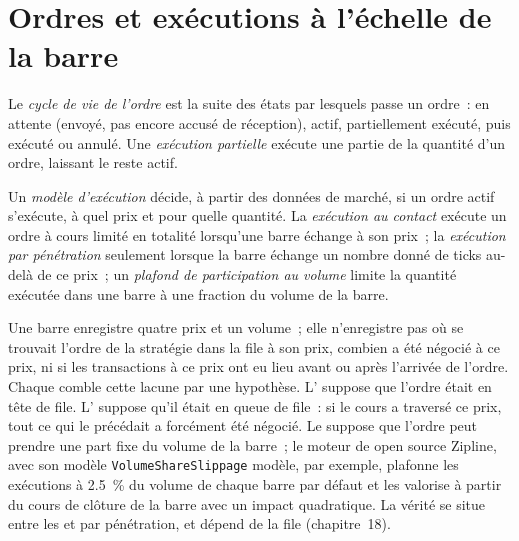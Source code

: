 \section{Ordres et exécutions à l'échelle de la barre}

\begin{definition}\label{def:rs:event-driven-backtests:lifecycle}
Le \emph{cycle de vie de l'ordre} est la suite des états par lesquels passe un ordre~: en attente (envoyé, pas encore accusé de réception),
actif, partiellement exécuté, puis exécuté ou annulé. Une \emph{exécution partielle} exécute une partie de la quantité d'un ordre, laissant le
reste actif.
\end{definition}

\begin{definition}\label{def:rs:event-driven-backtests:fill}
Un \emph{modèle d'exécution} décide, à partir des données de marché, si un ordre actif s'exécute, à quel prix et pour quelle quantité. La
\emph{exécution au contact} exécute un ordre à cours limité en totalité lorsqu'une barre échange à son prix~; la \emph{exécution par pénétration}
seulement lorsque la barre échange un nombre donné de ticks au-delà de ce prix~; un \emph{plafond de participation au volume} limite la quantité
exécutée dans une barre à une fraction du volume de la barre.
\end{definition}

Une barre enregistre quatre prix et un volume~; elle n'enregistre pas où se trouvait l'ordre de la stratégie dans la file à son prix, combien a été négocié à ce prix, ni
si les transactions à ce prix ont eu lieu avant ou après l'arrivée de l'ordre. Chaque  comble cette lacune par une hypothèse. L' suppose
que l'ordre était en tête de file. L' suppose qu'il était en queue de file~: si le cours a traversé ce prix, tout ce qui le précédait a forcément été négocié.
Le  suppose que l'ordre peut prendre une part fixe du volume de la barre~; le moteur de  open source Zipline, avec son modèle \texttt{VolumeShareSlippage}
modèle, par exemple, plafonne les exécutions à 2.5~\% du volume de chaque barre par défaut et les valorise à partir du cours de clôture de la barre avec un impact quadratique. La vérité se situe
entre les  et par pénétration, et dépend de la file (chapitre~18).

